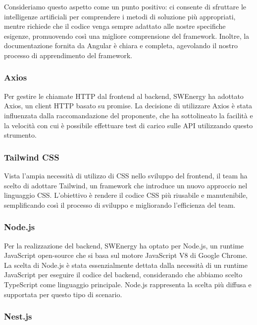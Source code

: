 Consideriamo questo aspetto come un punto positivo: ci consente di sfruttare le
intelligenze artificiali per comprendere i metodi di soluzione più appropriati,
mentre richiede che il codice venga sempre adattato alle nostre specifiche
esigenze, promuovendo così una migliore comprensione del framework. Inoltre, la
documentazione fornita da Angular è chiara e completa, agevolando il nostro
processo di apprendimento del framework.

\subsubsection{Axios}

Per gestire le chiamate HTTP dal frontend al backend, SWEnergy ha adottato
Axios, un client HTTP basato su promise. La decisione di utilizzare Axios è
stata influenzata dalla raccomandazione del proponente, che ha sottolineato la
facilità e la velocità con cui è possibile effettuare test di carico sulle API
utilizzando questo strumento.

\subsubsection{Tailwind CSS}

Vista l'ampia necessità di utilizzo di CSS nello sviluppo del frontend, il team
ha scelto di adottare Tailwind, un framework che introduce un nuovo approccio
nel linguaggio CSS. L'obiettivo è rendere il codice CSS più riusabile e
manutenibile, semplificando così il processo di sviluppo e migliorando
l'efficienza del team.

\subsubsection{Node.js}

Per la realizzazione del backend, SWEnergy ha optato per Node.js, un runtime
JavaScript open-source che si basa sul motore JavaScript V8 di Google Chrome. La
scelta di Node.js è stata essenzialmente dettata dalla necessità di un runtime
JavaScript per eseguire il codice del backend, considerando che abbiamo scelto
TypeScript come linguaggio principale. Node.js rappresenta la scelta più diffusa
e supportata per questo tipo di scenario.

\subsubsection{Nest.js}

